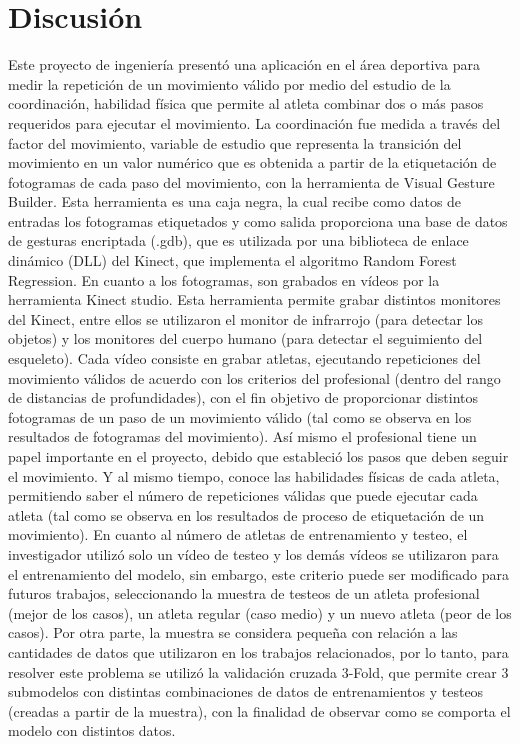 \chapter{Discusi\'on}
Este proyecto de ingenier\'ia present\'o una aplicaci\'on en el \'area deportiva para medir la repetici\'on de un movimiento v\'alido por medio del estudio de la coordinaci\'on, habilidad f\'isica que permite al atleta combinar dos o m\'as pasos requeridos para ejecutar el movimiento. 
\medbreak
La coordinaci\'on fue medida a trav\'es del factor del movimiento, variable de estudio que representa la transici\'on del movimiento en un valor num\'erico que es obtenida a partir de la etiquetaci\'on de fotogramas de cada paso del movimiento, con la herramienta de Visual Gesture Builder.
\medbreak
Esta herramienta es una caja negra, la cual recibe como datos de entradas los fotogramas etiquetados y como salida proporciona una base de datos de gesturas encriptada (.gdb), que es utilizada por una biblioteca de enlace din\'amico (DLL) del Kinect, que implementa el algoritmo Random Forest Regression.
\medbreak
En cuanto a los fotogramas, son grabados en v\'ideos por la herramienta Kinect studio. Esta herramienta permite grabar distintos monitores del Kinect, entre ellos se utilizaron el monitor de infrarrojo (para detectar los objetos) y los monitores del cuerpo humano (para detectar el seguimiento del esqueleto).
\medbreak
Cada v\'ideo consiste en grabar atletas, ejecutando repeticiones del movimiento v\'alidos de acuerdo con los criterios del profesional (dentro del rango de distancias de profundidades), con el fin objetivo de proporcionar distintos fotogramas de un paso de un movimiento v\'alido (tal como se observa en los resultados de fotogramas del movimiento).
\medbreak
As\'i mismo el profesional tiene un papel importante en el proyecto, debido que estableci\'o los pasos que deben seguir el movimiento. Y al mismo tiempo, conoce las habilidades f\'isicas de cada atleta, permitiendo saber el n\'umero de repeticiones v\'alidas que puede ejecutar cada atleta (tal como se observa en los resultados de proceso de etiquetaci\'on de un movimiento).
\medbreak
En cuanto al n\'umero de atletas de entrenamiento y testeo, el investigador utiliz\'o solo un v\'ideo de testeo y los dem\'as v\'ideos se utilizaron para el entrenamiento del modelo, sin embargo, este criterio puede ser modificado para futuros trabajos, seleccionando la muestra de testeos de un atleta profesional (mejor de los casos), un atleta regular (caso medio) y un nuevo atleta (peor de los casos).
\medbreak
Por otra parte, la muestra se considera peque\~na con relaci\'on a las cantidades de datos que utilizaron en los trabajos relacionados, por lo tanto, para resolver este problema se utiliz\'o la validaci\'on cruzada 3-Fold, que permite crear 3 submodelos con distintas combinaciones de datos de entrenamientos y testeos (creadas a partir de la muestra), con la finalidad de observar como se comporta el modelo con distintos datos.
